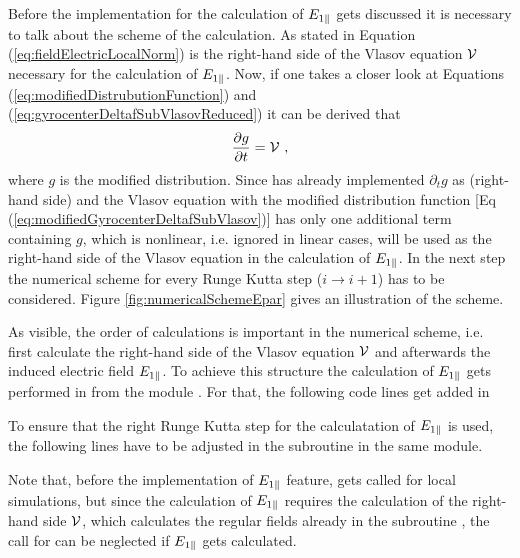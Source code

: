 Before the implementation for the calculation of $E_{1\parallel}$ gets discussed it is necessary to talk about the scheme of the calculation. As stated in Equation (\ref{eq:fieldElectricLocalNorm}) is the right-hand side of the Vlasov equation $\mathcal{V}$ necessary for the calculation of $E_{1\parallel}$. Now, if one takes a closer look at Equations (\ref{eq:modifiedDistrubutionFunction}) and (\ref{eq:gyrocenterDeltafSubVlasovReduced}) it can be derived that
\begin{gather}
    \frac{\partial g}{\partial t} = \mathcal{V}~,
    \label{eq:rightHandSide}
\end{gather}
where $g$ is the modified distribution. Since {\gkw} has already implemented $\partial_t g$ as  (right-hand side) and the Vlasov equation with the modified distribution function [Eq (\ref{eq:modifiedGyrocenterDeltafSubVlasov})] has only one additional term containing $g$, which is nonlinear, i.e. ignored in linear cases,  will be used as the right-hand side of the Vlasov equation in the calculation of $E_{1\parallel}$. In the next step the numerical scheme for every Runge Kutta step ($i \rightarrow i+1$) has to be considered. Figure \ref{fig:numericalSchemeEpar} gives an illustration of the scheme.


As visible, the order of calculations is important in the numerical scheme, i.e. first calculate the right-hand side of the Vlasov equation $\mathcal{V}$ and afterwards the induced electric field $E_{1\parallel}$. To achieve this structure the calculation of $E_{1\parallel}$ gets performed in  from the module . For that, the following code lines get added in 



To ensure that the right Runge Kutta step for the calculatation of $E_{1\parallel}$ is used, the following lines have to be adjusted in the subroutine  in the same module.



Note that, before the implementation of $E_{1\parallel}$ feature,  gets called for local simulations, but since the calculation of $E_{1\parallel}$ requires the calculation of the right-hand side $\mathcal{V}$, which calculates the regular fields already in the subroutine , the call for  can be neglected if $E_{1\parallel}$ gets calculated.

